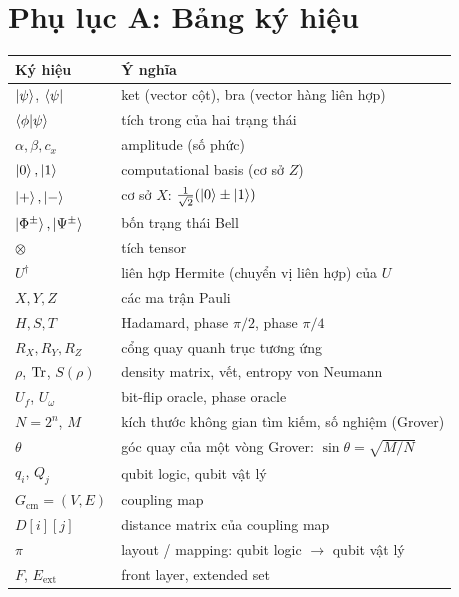 \section*{Phụ lục A: Bảng ký hiệu}
\label{app:notation}

\begin{table}[h]
  \centering
  \small
  \begin{tabular}{@{}ll@{}}
    \toprule
    \textbf{Ký hiệu} & \textbf{Ý nghĩa} \\
    \midrule
    $\ket{\psi}$, $\bra{\psi}$ & ket (vector cột), bra (vector hàng liên hợp) \\
    $\braket{\phi|\psi}$ & tích trong của hai trạng thái \\
    $\alpha, \beta, c_x$ & amplitude (số phức) \\
    $\ket{0},\ket{1}$ & computational basis (cơ sở $Z$) \\
    $\ket{+},\ket{-}$ & cơ sở $X$: $\tfrac{1}{\sqrt2}(\ket{0}\pm\ket{1})$ \\
    $\ket{\Phi^\pm},\ket{\Psi^\pm}$ & bốn trạng thái Bell \\
    $\otimes$ & tích tensor \\
    $U^\dagger$ & liên hợp Hermite (chuyển vị liên hợp) của $U$ \\
    $X, Y, Z$ & các ma trận Pauli \\
    $H, S, T$ & Hadamard, phase $\pi/2$, phase $\pi/4$ \\
    $R_X, R_Y, R_Z$ & cổng quay quanh trục tương ứng \\
    $\rho$, $\mathrm{Tr}$, $S(\rho)$ & density matrix, vết, entropy von Neumann \\
    $U_f$, $U_\omega$ & bit-flip oracle, phase oracle \\
    $N = 2^n$, $M$ & kích thước không gian tìm kiếm, số nghiệm (Grover) \\
    $\theta$ & góc quay của một vòng Grover: $\sin\theta = \sqrt{M/N}$ \\
    \midrule
    $q_i$, $Q_j$ & qubit logic, qubit vật lý \\
    $G_{\text{cm}} = (V, E)$ & coupling map \\
    $D[i][j]$ & distance matrix của coupling map \\
    $\pi$ & layout / mapping: qubit logic $\to$ qubit vật lý \\
    $F$, $E_{\text{ext}}$ & front layer, extended set \\

\end{tabular}
\end{table}
